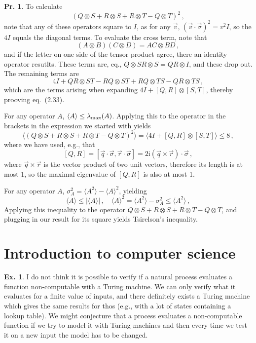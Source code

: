 \documentclass[a4paper,12pt]{article}
\def\imagi{\mathrm{i}}
\theoremstyle{definition}
\newtheorem{exercise}{Ex.}[section]
\newtheorem{problem}{Pr.}[section]
\begin{document}
\begin{problem}
 To calculate
 \[
  (Q\otimes S + R\otimes S + R\otimes T - Q\otimes T)^2\,,
 \]
 note that any of these operators square to $I$, as for any $\vec{v}$, $(\vec{v}\cdot\vec{\sigma})^2=v^2 I$, so the $4I$ equals the diagonal terms. To evaluate the cross term, note that
 \[
  (A\otimes B)(C\otimes D) = AC\otimes BD\,,
 \]
 and if the letter on one side of the tensor product agree, there an identity operator resutlts. These terms are, eq., $Q\otimes S R\otimes S = QR \otimes I$, and these drop out. The remaining terms are
 \[
  4 I + QR\otimes ST - RQ\otimes ST + RQ\otimes TS -QR \otimes TS\,,
 \]
 which are the terms arising when expanding $4I + [Q,R]\otimes [S, T]$, thereby prooving eq.\ (2.33).
 
  For any operator $A$, $\langle A\rangle \le \lambda_{\rm max}(A)$. Applying this to the operator in the brackets in the expression we started with yields
 \[
  \langle (Q\otimes S + R\otimes S + R\otimes T - Q\otimes T)^2\rangle = \langle 4I + [Q,R]\otimes [S, T] \rangle \le 8\,,
 \]
  where we have used, e.g., that
  \[
   [Q, R] = [\vec{q}\cdot\vec\sigma, \vec{r}\cdot\vec{\sigma}] = 2\imagi (\vec{q}\times\vec{r})\cdot\vec{\sigma}\,,
  \]
  where $\vec{q}\times\vec{r}$ is the vector product of two unit vectors, therefore its length is at most 1, so the maximal eigenvalue of $[Q, R]$ is also at most 1.
  
  For any operator $A$, $\sigma_A^2 = \langle A^2\rangle - \langle A\rangle^2$, yielding
  \[
   \langle A\rangle \le |\langle A\rangle |\,,\quad \langle A\rangle^2 = \langle A^2\rangle -\sigma_A^2 \le \langle A^2\rangle\,,
  \]
  Applying this inequality to the operator $Q\otimes S + R\otimes S + R\otimes T - Q\otimes T$, and plugging in our result for its square yields Tsirelson's inequality.
\end{problem}

\section{Introduction to computer science}\label{sec:introductionToComputerScience}

\begin{exercise}
 I do not think it is possible to verify if a natural process evaluates a function non-computable with a Turing machine. We can only verify what it evaluates for a finite value of inputs, and there definitely exists a Turing machine which gives the same results for thos (e.g., with a lot of states containing a lookup table). We might conjecture that a process evaluates a non-computable function if we try to model it with Turing machines and then every time we test it on a new input the model has to be changed.
\end{exercise}
\end{document}

